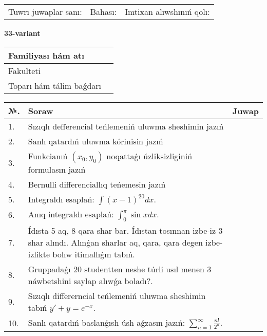 \documentclass{article}
\begin{document}
\vspace{1cm}

\begin{tabular}{ c c c }
Tuwrı juwaplar sanı: \underline{\hspace{2cm}} & Bahası: \underline{\hspace{2cm}} & Imtixan alıwshınıń qolı: \underline{\hspace{2cm}} \\
\end{tabular}

\newpage

\begin{center}\textbf{33-variant}\end{center}

\bgroup
\def\arraystretch{1.5}
\begin{tabular}{ |m{6cm}|m{10cm}| }
  \hline
  Familiyası hám atı & \\
  \hline
  Fakulteti &\\
  \hline
  Toparı hám tálim baǵdarı & \\
  \hline
\end{tabular}
\egroup

\vspace{0.5cm}

\bgroup
\def\arraystretch{2}
\begin{tabular}{ |l|m{8cm}|m{7cm}| }
  \hline
  №. & Soraw & Juwap \\
  \hline
  1. & Sızıqlı defferencial teńlemeniń uluwma sheshimin jazıń &  \\
  \hline
  2. & Sanlı qatardıń uluwma kórinisin jazıń &  \\
  \hline
  3. & Funkcianıń $(x_{0}, y_{0})$ noqattaǵı úzliksizliginiń formulasın jazıń &  \\
  \hline
  4. & Bernulli differenciallıq teńemesin jazıń &  \\
  \hline
  5. & Integraldı esaplań: $\displaystyle\int (x - 1)^{20}dx$. &  \\
  \hline
  6. & Anıq integraldı esaplań: $\displaystyle\int_{0}^{\pi}\sin xdx$. &  \\
  \hline
  7. & Ídısta 5 aq, 8 qara shar bar. Ídıstan tosınnan izbe-iz 3 shar alındı. Alınǵan sharlar aq, qara, qara degen izbe-izlikte bolıw itimallıǵın tabıń. &  \\
  \hline
  8. & Gruppadaǵı 20 studentten neshe túrli usıl menen 3 náwbetshini saylap alıwǵa boladı?. &  \\
  \hline
  9. & Sızıqlı differerncial teńlemeniń uluwma sheshimin tabıń $y' + y =e^{-x}$. &  \\
  \hline
  10. & Sanlı qatardıń baslanǵısh úsh aǵzasın jazıń: $\displaystyle\sum_{n = 1}^{\infty}\frac{n!}{2^{n}}$. &  \\
  \hline
\end{tabular}
\egroup
\end{document}
